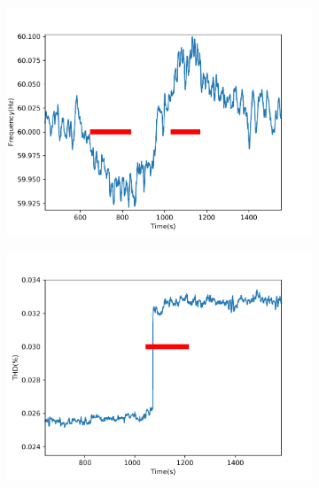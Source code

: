 \begin{figure}[h]
    \centering
    \begin{subfigure}{0.5\textwidth}
        \centering
        \includegraphics[width=1\linewidth]{img/napali_eval/napali_live_f.pdf}
        \caption{}
        \label{fig:expdes:7:1}
    \end{subfigure}%
    \begin{subfigure}{0.5\textwidth}
        \centering
        \includegraphics[width=1\linewidth]{img/napali_eval/napali_live_thd.pdf}
        \caption{}
        \label{fig:expdes:7:2}
    \end{subfigure}


\end{figure}
